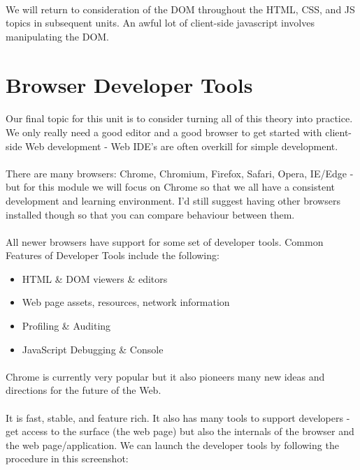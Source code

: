 \paragraph{} We will return to consideration of the DOM throughout the HTML, CSS, and JS topics in subsequent units. An awful lot of client-side javascript involves manipulating the DOM.

\section{Browser Developer Tools}
\paragraph{} Our final topic for this unit is to consider turning all of this theory into practice. We only really need a good editor and a good browser to get started with client-side Web development - Web IDE’s are often overkill for simple development.
\paragraph{} There are many browsers: Chrome, Chromium, Firefox, Safari, Opera, IE/Edge - but for this module we will focus on Chrome so that we all have a consistent development and learning environment. I'd still suggest having other browsers installed though so that you can compare behaviour between them.

\paragraph{} All newer browsers have support for some set of developer tools. Common Features of Developer Tools include the following:
\begin{itemize}
\item HTML \& DOM viewers \& editors
\item Web page assets, resources, network information 
\item Profiling \& Auditing
\item JavaScript Debugging \& Console 
\end{itemize}

\paragraph{} Chrome is currently very popular but it also pioneers many new ideas and directions for the future of the Web.
\paragraph{} It is fast, stable, and feature rich. It also has many tools to support developers - get access to the surface (the web page) but also the internals of the browser and the web page/application. We can launch the developer tools by following the procedure in this screenshot:

